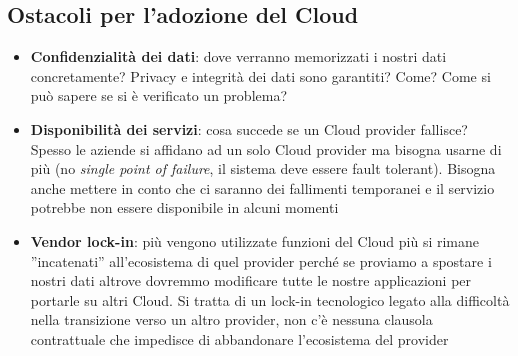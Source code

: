 \subsection{Ostacoli per l'adozione del Cloud}
\begin{itemize}
    \item \textbf{Confidenzialità dei dati}: dove verranno memorizzati i nostri dati concretamente? Privacy e integrità dei dati sono garantiti? Come? Come si può sapere se si è verificato un problema?
    \item \textbf{Disponibilità dei servizi}: cosa succede se un Cloud provider fallisce? Spesso le aziende si affidano ad un solo Cloud provider ma bisogna usarne di più (no \textit{single point of failure}, il sistema deve essere fault tolerant). Bisogna anche mettere in conto che ci saranno dei fallimenti temporanei e il servizio potrebbe non essere disponibile in alcuni momenti
    \item \textbf{Vendor lock-in}: più vengono utilizzate funzioni del Cloud più si rimane ”incatenati” all'ecosistema di quel provider perché se proviamo a spostare i nostri dati altrove dovremmo modificare tutte le nostre applicazioni per portarle su altri Cloud. Si tratta di un lock-in tecnologico legato alla difficoltà nella transizione verso un altro provider, non c'è nessuna clausola contrattuale che impedisce di abbandonare l'ecosistema del provider
\end{itemize}